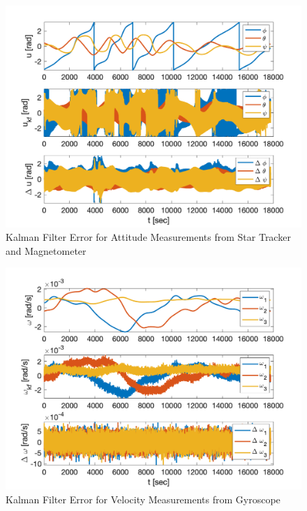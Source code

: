 \begin{figure}[H]
    \centering
    \captionsetup{ justification = centering }
    \includegraphics[width = 12cm]{Images/PS8/kalman_filter_meas_update_error_attitude.png}
    \caption{Kalman Filter Error for Attitude Measurements from Star Tracker and Magnetometer}
    \label{fig:kalman_error_attitude}
\end{figure}

\begin{figure}[H]
    \centering
    \captionsetup{ justification = centering }
    \includegraphics[width = 12cm]{Images/PS8/kalman_filter_meas_update_error_velocities.png}
    \caption{Kalman Filter Error for Velocity Measurements from Gyroscope}
    \label{fig:kalman_error_attitude}
\end{figure}

